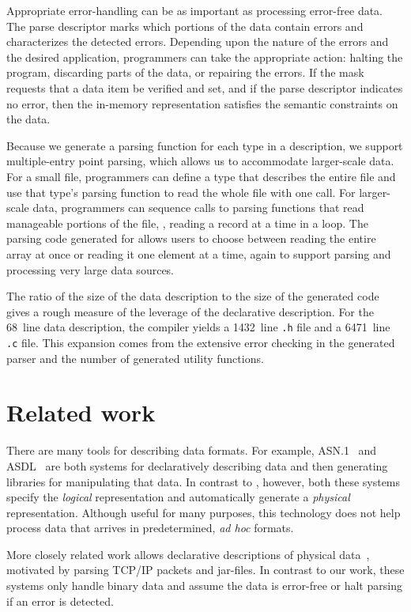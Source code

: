 Appropriate error-handling can be as important as processing
error-free data.  The parse descriptor marks which portions of the
data contain errors and characterizes the detected errors.
Depending upon the nature of the errors and the desired application,
programmers can take the appropriate action: halting the program,
discarding parts of the data, or repairing the errors.
If the mask requests
that a data item be verified and set, and if the parse descriptor
indicates no error, then the in-memory representation satisfies the
semantic constraints on the data.

Because we generate a parsing function for each type in a \pads{} description,
we support multiple-entry point parsing, which allows us to 
accommodate larger-scale data.
For a small file, programmers can define a \pads{} type that describes
the entire file and use that type's parsing function to read the whole
file with one call.  For larger-scale data, programmers can sequence
calls to parsing functions that read manageable portions of the file,
\eg{}, reading a record at a time in a loop.  The parsing code generated
for  allows users to choose between reading the entire array
at once or reading it one element at a time, again to support parsing
and processing very large data sources.

The ratio of the size of the data description to the size of the generated code gives a rough measure of the leverage of the
declarative description.  For the 
68~line \dibbler{} data description, the compiler yields a 1432~line \texttt{.h} file
and a 6471~line \texttt{.c} file.  This expansion comes from the extensive error checking in the generated parser and the number of generated utility functions.


\section{Related work}
There are many tools for describing data formats. For example,
\textsc{ASN.1}~\cite{asn} and \textsc{ASDL}~\cite{asdl} are both
systems for declaratively describing data and then generating
libraries for manipulating that data.  In contrast to \PADS{},
however, both these systems specify the {\em logical\/} representation
and automatically generate a {\em physical\/} representation.
Although useful for many purposes, this technology does not help
process data that arrives in predetermined, \textit{ad hoc} formats.


More closely related work allows declarative descriptions of physical
data~\cite{sigcomm00,erlang-bit-syntax,gpce02}, motivated by parsing
\textsc{TCP/IP} packets and \java{} jar-files.  In contrast to our
work, these systems only handle binary data and assume the data is
error-free or halt parsing if an error is detected.  

